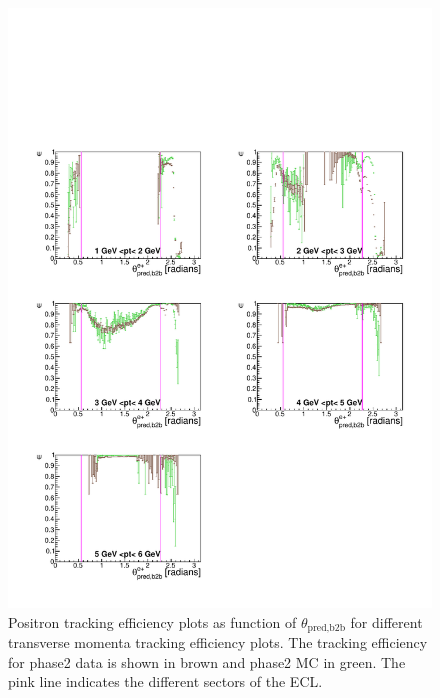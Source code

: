 \documentclass[a4paper,11pt,twosided,final,german,openbib,pdftex,listof=totoc,bibliography=totoc]{scrbook}
\begin{document}
\begin{figure}[!htbp]
	\centering
	\includegraphics[width=\textwidth]{Plots/master/xPtMThetaep}
	\caption[Transverse Momentum $\theta_{\textrm{pred,b2b}}$ Positron Efficiency Phase2]{Positron tracking efficiency plots as function of $\theta_{\textrm{pred,b2b}}$ for different transverse momenta tracking efficiency plots. The tracking efficiency for phase2 data is shown in brown and phase2 MC in green. The pink line indicates the different sectors of the ECL.}
	\label{plt:xPtMThetaep}
\end{figure}

\newpage
\end{document}
